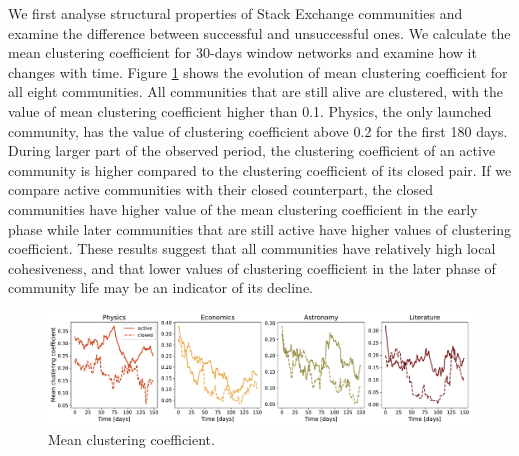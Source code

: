 We first analyse structural properties of Stack Exchange communities and examine the difference between successful and unsuccessful ones. We calculate the mean clustering coefficient for 30-days window networks and examine how it changes with time. Figure \ref{fig:clustering} shows the evolution of mean clustering coefficient for all eight communities. All communities that are still alive are clustered, with the value of mean clustering coefficient higher than 0.1. Physics, the only launched community, has the value of clustering coefficient above 0.2 for the first 180 days.
During larger part of the observed period, the clustering coefficient of an active community is higher compared to the clustering coefficient of its closed pair. If we compare active communities with their closed counterpart, the closed communities have higher value of the mean clustering coefficient in the early phase while later communities that are still active have higher values of clustering coefficient. These results suggest that all communities have relatively high local cohesiveness, and that lower values of clustering coefficient in the later phase of community life may be an indicator of its decline. 

\begin{figure}
	\centering
	\includegraphics[width=\linewidth]{figures/stackexchange/clustering.pdf}%
	\caption{Mean clustering coefficient.}
	\label{fig:clustering}
\end{figure}
